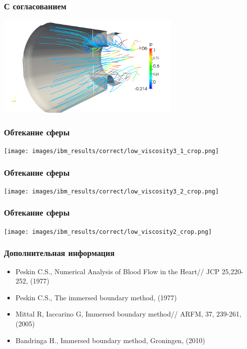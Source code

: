 \documentclass[14pt]{beamer}
\begin{document}
\begin{frame}
\frametitle{С согласованием}
    \begin{center}
    \includegraphics[width=9cm]{images/valves_simple_angle.png}
    \end{center}
\end{frame}

\begin{frame}
\frametitle{Обтекание сферы}
    \begin{center}
    \texttt{[image: images/ibm\_results/correct/low\_viscosity3\_1\_crop.png]}
    \end{center}
\end{frame}

\begin{frame}
\frametitle{Обтекание сферы}
    \begin{center}
    \texttt{[image: images/ibm\_results/correct/low\_viscosity3\_2\_crop.png]}
    \end{center}
\end{frame}

\begin{frame}
\frametitle{Обтекание сферы}
    \begin{center}
    \texttt{[image: images/ibm\_results/correct/low\_viscosity2\_crop.png]}
    \end{center}
\end{frame}

\begin{frame}
\frametitle{Дополнительная информация}
    \begin{itemize}
        \item Peskin C.S., Numerical Analysis of Blood Flow in the Heart// JCP 25,220-252, (1977)
        \item Peskin C.S., The immersed boundary method, (1977)
        \item Mittal R, Iaccarino G, Immersed boundary method// ARFM, 37, 239-261, (2005)
        \item Bandringa H., Immersed boundary method, Groningen, (2010)
    \end{itemize}
\end{frame}
\end{document}
